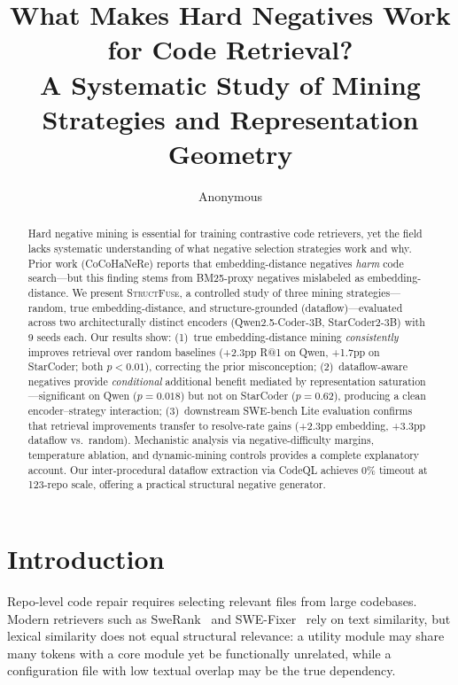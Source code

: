 \documentclass[11pt,a4paper]{article}
\title{What Makes Hard Negatives Work for Code Retrieval?\\A Systematic Study of Mining Strategies and Representation Geometry}
\author{Anonymous}
\newcommand{\ours}{\textsc{StructFuse}}
\begin{document}
\maketitle

\begin{abstract}
Hard negative mining is essential for training contrastive code retrievers, yet the field lacks systematic understanding of what negative selection strategies work and why. Prior work (CoCoHaNeRe) reports that embedding-distance negatives \emph{harm} code search---but this finding stems from BM25-proxy negatives mislabeled as embedding-distance. We present \ours{}, a controlled study of three mining strategies---random, true embedding-distance, and structure-grounded (dataflow)---evaluated across two architecturally distinct encoders (Qwen2.5-Coder-3B, StarCoder2-3B) with 9 seeds each. Our results show: (1)~true embedding-distance mining \emph{consistently} improves retrieval over random baselines (+2.3pp R@1 on Qwen, +1.7pp on StarCoder; both $p < 0.01$), correcting the prior misconception; (2)~dataflow-aware negatives provide \emph{conditional} additional benefit mediated by representation saturation---significant on Qwen ($p = 0.018$) but not on StarCoder ($p = 0.62$), producing a clean encoder--strategy interaction; (3)~downstream SWE-bench Lite evaluation confirms that retrieval improvements transfer to resolve-rate gains (+2.3pp embedding, +3.3pp dataflow vs.\ random). Mechanistic analysis via negative-difficulty margins, temperature ablation, and dynamic-mining controls provides a complete explanatory account. Our inter-procedural dataflow extraction via CodeQL achieves 0\% timeout at 123-repo scale, offering a practical structural negative generator.
\end{abstract}

\section{Introduction}

Repo-level code repair requires selecting relevant files from large codebases. Modern retrievers such as SweRank~\cite{swerank} and SWE-Fixer~\cite{swefixer} rely on text similarity, but lexical similarity does not equal structural relevance: a utility module may share many tokens with a core module yet be functionally unrelated, while a configuration file with low textual overlap may be the true dependency.
\end{document}
